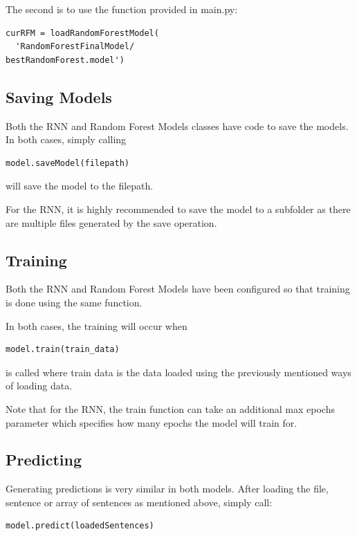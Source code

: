 \documentclass[twoside,twocolumn]{article}
\begin{document}
The second is to use the function provided in main.py:
\begin{lstlisting}
curRFM = loadRandomForestModel(
  'RandomForestFinalModel/
bestRandomForest.model')
\end{lstlisting}

\subsection{Saving Models}

Both the RNN and Random Forest Models classes have code to save the models. In both cases,
simply calling

\begin{lstlisting}
model.saveModel(filepath)
\end{lstlisting}

will save the model to the filepath.

For the RNN, it is highly recommended to save the model to a subfolder as there are multiple files
generated by the save operation.


\subsection{Training}

Both the RNN and Random Forest Models have been configured so that training is done using the same function.

In both cases, the training will occur when

\begin{lstlisting}
model.train(train_data)
\end{lstlisting}

is called where train data is the data loaded using the previously mentioned ways of loading data.

Note that for the RNN, the train function can take an additional max epochs parameter which specifies
how many epochs the model will train for.

\subsection{Predicting}

Generating predictions is very similar in both models. After loading the file, sentence or array of sentences
as mentioned above, simply call:

\begin{lstlisting}
model.predict(loadedSentences)
\end{lstlisting}
\end{document}
